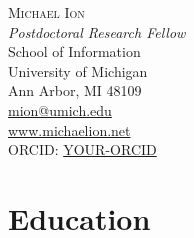 \documentclass[11pt,letterpaper]{article}
\begin{document}
\begin{center}
\textsc{\LARGE Michael Ion}\\[0.5em]
\textit{Postdoctoral Research Fellow}\\[0.5em]
School of Information\\
University of Michigan\\
Ann Arbor, MI 48109\\
\href{mailto:mion@umich.edu}{mion@umich.edu}\\
\href{https://www.michaelion.net}{www.michaelion.net}\\
ORCID: \href{https://orcid.org/YOUR-ORCID}{YOUR-ORCID}
\end{center}

\section*{Education}
\end{document}
